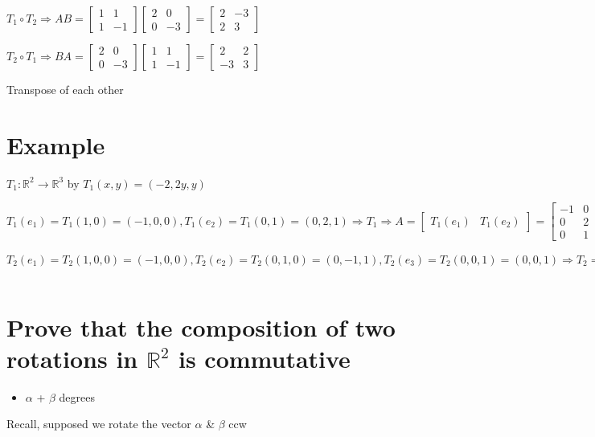 \documentclass[11pt]{article}
\begin{document}
\(T_{1}\circ{}T_{2} \Rightarrow{} AB = \begin{bmatrix}1&1\\1&-1\end{bmatrix}\begin{bmatrix}2&0\\0&-3\end{bmatrix} = \begin{bmatrix}2&-3\\2&3\end{bmatrix}\)

\(T_{2}\circ{}T_{1} \Rightarrow{} BA = \begin{bmatrix}2&0\\0&-3\end{bmatrix} \begin{bmatrix}1&1\\1&-1\end{bmatrix} = \begin{bmatrix}2&2\\-3&3\end{bmatrix}\)

Transpose of each other
\section{Example}
\label{sec:org36f55d8}
\(T_{1}: \mathbb{R}^{2}\rightarrow{}\mathbb{R}^{3}\) by \(T_{1}(x,y) = (-2,2y,y)\)

\(T_{1}(e_1)=T_{1}(1,0)=(-1,0,0), T_{1}(e_{2})=T_{1}(0,1) = (0,2,1)\Rightarrow{}T_{1}\Rightarrow{}A=\begin{bmatrix}T_{1}(e_1)&T_{1}(e_{2})\end{bmatrix}=\begin{bmatrix}-1&0\\0&2\\0&1\end{bmatrix}\)
\(T_{2}(e_{1}) = T_{2}(1,0,0) = (-1,0,0), T_{2}(e_{2}) = T_{2}(0,1,0) = (0,-1,1), T_{2}(e_{3})=T_{2}(0,0,1) = (0,0,1) \Rightarrow{} T_{2} \Rightarrow{} B = \begin{bmatrix}T_{2}(e_1)&T_{2}(e_2)&T_{3}(e_3)\end{bmatrix} = \begin{bmatrix}3&0&0\\0&-1&0\\1&1&1\end{bmatrix}\)
\section{Prove that the composition of two rotations in \(\mathbb{R}^{2}\) is commutative}
\label{sec:org132fcea}
\begin{itemize}
\item \(\alpha\) + \(\beta\) degrees
\end{itemize}
Recall, supposed we rotate the vector \(\alpha\) \& \(\beta\) ccw
\end{document}
